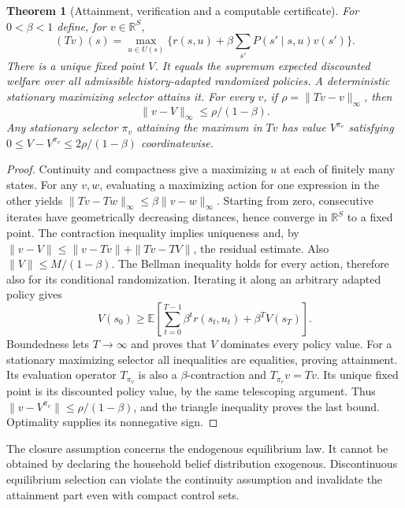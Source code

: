 \documentclass[11pt]{article}
\newtheorem{theorem}{Theorem}
\theoremstyle{remark}
\newcommand{\E}{\mathbb E}
\newcommand{\R}{\mathbb R}
\begin{document}
\begin{theorem}[Attainment, verification and a computable certificate]
For $0<\beta<1$ define, for $v\in\R^S$,
\[
 (Tv)(s)=\max_{u\in U(s)}
 \{r(s,u)+\beta\sum_{s'}P(s'\mid s,u)v(s')\}.
\]
There is a unique fixed point $V$. It equals the supremum expected
discounted welfare over all admissible history-adapted randomized
policies. A deterministic stationary maximizing selector attains it.
For every $v$, if $\rho=\|Tv-v\|_\infty$, then
\[
 \|v-V\|_\infty\leq\rho/(1-\beta).
\]
Any stationary selector $\pi_v$ attaining the maximum in $Tv$ has
value $V^{\pi_v}$ satisfying
$0\leq V-V^{\pi_v}\leq2\rho/(1-\beta)$ coordinatewise.
\end{theorem}
\begin{proof}
Continuity and compactness give a maximizing $u$ at each of finitely many
states. For any $v,w$, evaluating a maximizing action for one expression
in the other yields
$\|Tv-Tw\|_\infty\leq\beta\|v-w\|_\infty$.
Starting from zero, consecutive iterates have geometrically decreasing
distances, hence converge in $\R^S$ to a fixed point. The contraction
inequality implies uniqueness and, by
$\|v-V\|\leq\|v-Tv\|+\|Tv-TV\|$, the residual estimate.
Also $\|V\|\leq M/(1-\beta)$.
The Bellman inequality holds for every action, therefore also for its
conditional randomization. Iterating it along an arbitrary adapted
policy gives
\[
 V(s_0)\geq\E\left[\sum_{t=0}^{T-1}\beta^t r(s_t,u_t)
                          +\beta^T V(s_T)\right].
\]
Boundedness lets $T\to\infty$ and proves that $V$ dominates every policy
value. For a stationary maximizing selector all inequalities are
equalities, proving attainment. Its evaluation operator $T_{\pi_v}$
is also a $\beta$-contraction and
$T_{\pi_v}v=Tv$. Its unique fixed point is its discounted policy value,
by the same telescoping argument. Thus
$\|v-V^{\pi_v}\|\leq\rho/(1-\beta)$, and the triangle inequality
proves the last bound. Optimality supplies its nonnegative sign.
\end{proof}

The closure assumption concerns the endogenous equilibrium law. It cannot
be obtained by declaring the household belief distribution exogenous.
Discontinuous equilibrium selection can violate the continuity assumption
and invalidate the attainment part even with compact control sets.
\end{document}
